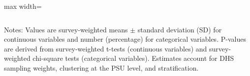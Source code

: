 \begin{table}[htbp]
\begin{threeparttable}
\begin{adjustbox}{max width=\textwidth}
\begin{tabularx}{\textwidth}{Xrrr}
\bottomrule
\end{tabularx}
\end{adjustbox}

\begin{tablenotes}[flushleft]
\footnotesize
\item Notes: Values are survey-weighted means $\pm$ standard deviation (SD) for continuous variables and number (percentage) for categorical variables. P-values are derived from survey-weighted t-tests (continuous variables) and survey-weighted chi-square tests (categorical variables). Estimates account for DHS sampling weights, clustering at the PSU level, and stratification.
\end{tablenotes}

\end{threeparttable}
\end{table}
